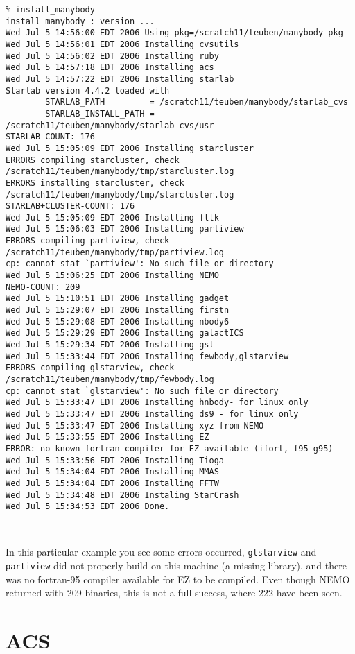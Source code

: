{\footnotesize\begin{verbatim}
% install_manybody
install_manybody : version ...
Wed Jul 5 14:56:00 EDT 2006 Using pkg=/scratch11/teuben/manybody_pkg
Wed Jul 5 14:56:01 EDT 2006 Installing cvsutils
Wed Jul 5 14:56:02 EDT 2006 Installing ruby
Wed Jul 5 14:57:18 EDT 2006 Installing acs
Wed Jul 5 14:57:22 EDT 2006 Installing starlab
Starlab version 4.4.2 loaded with
        STARLAB_PATH         = /scratch11/teuben/manybody/starlab_cvs
        STARLAB_INSTALL_PATH = /scratch11/teuben/manybody/starlab_cvs/usr
STARLAB-COUNT: 176
Wed Jul 5 15:05:09 EDT 2006 Installing starcluster
ERRORS compiling starcluster, check /scratch11/teuben/manybody/tmp/starcluster.log
ERRORS installing starcluster, check /scratch11/teuben/manybody/tmp/starcluster.log
STARLAB+CLUSTER-COUNT: 176
Wed Jul 5 15:05:09 EDT 2006 Installing fltk
Wed Jul 5 15:06:03 EDT 2006 Installing partiview
ERRORS compiling partiview, check /scratch11/teuben/manybody/tmp/partiview.log
cp: cannot stat `partiview': No such file or directory
Wed Jul 5 15:06:25 EDT 2006 Installing NEMO
NEMO-COUNT: 209
Wed Jul 5 15:10:51 EDT 2006 Installing gadget
Wed Jul 5 15:29:07 EDT 2006 Installing firstn
Wed Jul 5 15:29:08 EDT 2006 Installing nbody6
Wed Jul 5 15:29:29 EDT 2006 Installing galactICS
Wed Jul 5 15:29:34 EDT 2006 Installing gsl
Wed Jul 5 15:33:44 EDT 2006 Installing fewbody,glstarview
ERRORS compiling glstarview, check /scratch11/teuben/manybody/tmp/fewbody.log
cp: cannot stat `glstarview': No such file or directory
Wed Jul 5 15:33:47 EDT 2006 Installing hnbody- for linux only
Wed Jul 5 15:33:47 EDT 2006 Installing ds9 - for linux only
Wed Jul 5 15:33:47 EDT 2006 Installing xyz from NEMO
Wed Jul 5 15:33:55 EDT 2006 Installing EZ
ERROR: no known fortran compiler for EZ available (ifort, f95 g95)
Wed Jul 5 15:33:56 EDT 2006 Installing Tioga
Wed Jul 5 15:34:04 EDT 2006 Installing MMAS
Wed Jul 5 15:34:04 EDT 2006 Installing FFTW
Wed Jul 5 15:34:48 EDT 2006 Instaling StarCrash
Wed Jul 5 15:34:53 EDT 2006 Done.



\end{verbatim}\normalsize

In this particular example you see some errors occurred, {\tt glstarview} and
{\tt partiview} did not
properly build on this machine (a missing library), and there was no fortran-95
compiler available for EZ to be compiled. Even though NEMO returned with 209
binaries, this is not a full success, where 222 have been seen.

\section{ACS}

}
